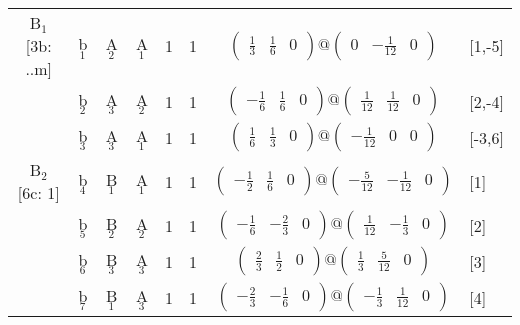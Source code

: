 \documentclass[fleqn,10pt,landscape]{article}
\begin{document}
\begin{itemize}
\begin{center}
\begin{longtable}{cc|cc|c|c|c|l}
B$_{1}$ [3b: ..m] & b$_{1}$ & A$_{2}$ & A$_{1}$ & 1 & 1 & $\begin{pmatrix} \frac{1}{3} & \frac{1}{6} & 0 \end{pmatrix}@\begin{pmatrix} 0 & - \frac{1}{12} & 0 \end{pmatrix}$ & [1,-5] \\
& b$_{2}$ & A$_{3}$ & A$_{2}$ & 1 & 1 & $\begin{pmatrix} - \frac{1}{6} & \frac{1}{6} & 0 \end{pmatrix}@\begin{pmatrix} \frac{1}{12} & \frac{1}{12} & 0 \end{pmatrix}$ & [2,-4] \\
& b$_{3}$ & A$_{3}$ & A$_{1}$ & 1 & 1 & $\begin{pmatrix} \frac{1}{6} & \frac{1}{3} & 0 \end{pmatrix}@\begin{pmatrix} - \frac{1}{12} & 0 & 0 \end{pmatrix}$ & [-3,6] \\ \hline
B$_{2}$ [6c: 1] & b$_{4}$ & B$_{1}$ & A$_{1}$ & 1 & 1 & $\begin{pmatrix} - \frac{1}{2} & \frac{1}{6} & 0 \end{pmatrix}@\begin{pmatrix} - \frac{5}{12} & - \frac{1}{12} & 0 \end{pmatrix}$ & [1] \\
& b$_{5}$ & B$_{2}$ & A$_{2}$ & 1 & 1 & $\begin{pmatrix} - \frac{1}{6} & - \frac{2}{3} & 0 \end{pmatrix}@\begin{pmatrix} \frac{1}{12} & - \frac{1}{3} & 0 \end{pmatrix}$ & [2] \\
& b$_{6}$ & B$_{3}$ & A$_{3}$ & 1 & 1 & $\begin{pmatrix} \frac{2}{3} & \frac{1}{2} & 0 \end{pmatrix}@\begin{pmatrix} \frac{1}{3} & \frac{5}{12} & 0 \end{pmatrix}$ & [3] \\
& b$_{7}$ & B$_{1}$ & A$_{3}$ & 1 & 1 & $\begin{pmatrix} - \frac{2}{3} & - \frac{1}{6} & 0 \end{pmatrix}@\begin{pmatrix} - \frac{1}{3} & \frac{1}{12} & 0 \end{pmatrix}$ & [4] \\

\end{longtable}
\end{center}
\end{itemize}
\end{document}
